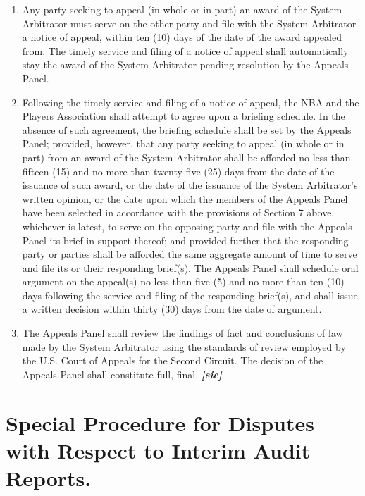 \documentclass[
]{book}
\providecommand{\tightlist}{%
  \setlength{\itemsep}{0pt}\setlength{\parskip}{0pt}}
\begin{document}
\begin{enumerate}
\def\labelenumi{(\alph{enumi})}
\tightlist
\item
  Any party seeking to appeal (in whole or in part) an award of the System Arbitrator must serve on the other party and file with the System Arbitrator a notice of appeal, within ten (10) days of the date of the award appealed from. The timely service and filing of a notice of appeal shall automatically stay the award of the System Arbitrator pending resolution by the Appeals Panel.
\item
  Following the timely service and filing of a notice of appeal, the NBA and the Players Association shall attempt to agree upon a briefing schedule. In the absence of such agreement, the briefing schedule shall be set by the Appeals Panel; provided, however, that any party seeking to appeal (in whole or in part) from an award of the System Arbitrator shall be afforded no less than fifteen (15) and no more than twenty-five (25) days from the date of the issuance of such award, or the date of the issuance of the System Arbitrator's written opinion, or the date upon which the members of the Appeals Panel have been selected in accordance with the provisions of Section 7 above, whichever is latest, to serve on the opposing party and file with the Appeals Panel its brief in support thereof; and provided further that the responding party or parties shall be afforded the same aggregate amount of time to serve and file its or their responding brief(s). The Appeals Panel shall schedule oral argument on the appeal(s) no less than five (5) and no more than ten (10) days following the service and filing of the responding brief(s), and shall issue a written decision within thirty (30) days from the date of argument.
\item
  The Appeals Panel shall review the findings of fact and conclusions of law made by the System Arbitrator using the standards of review employed by the U.S. Court of Appeals for the Second Circuit. The decision of the Appeals Panel shall constitute full, final, \textbf{\emph{{[}sic{]}}}
\end{enumerate}

\hypertarget{special-procedure-for-disputes-with-respect-to-interim-audit-reports.}{%
\section{Special Procedure for Disputes with Respect to Interim Audit Reports.}\label{special-procedure-for-disputes-with-respect-to-interim-audit-reports.}}
\end{document}
